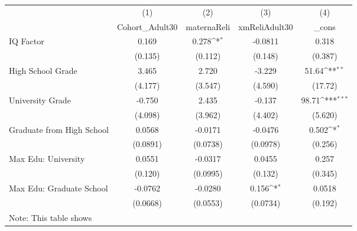 {
\def\sym#1{\ifmmode^{#1}\else\(^{#1}\)\fi}
\begin{tabular}{l*{4}{c}}
\hline\hline
            &\multicolumn{1}{c}{(1)}&\multicolumn{1}{c}{(2)}&\multicolumn{1}{c}{(3)}&\multicolumn{1}{c}{(4)}\\
            &\multicolumn{1}{c}{Cohort\_Adult30}&\multicolumn{1}{c}{maternaReli}&\multicolumn{1}{c}{xmReliAdult30}&\multicolumn{1}{c}{\_cons}\\
\hline
IQ Factor   &       0.169         &       0.278\sym{*}  &     -0.0811         &       0.318         \\
            &     (0.135)         &     (0.112)         &     (0.148)         &     (0.387)         \\
[1em]
High School Grade&       3.465         &       2.720         &      -3.229         &       51.64\sym{**} \\
            &     (4.177)         &     (3.547)         &     (4.590)         &     (17.72)         \\
[1em]
University Grade&      -0.750         &       2.435         &      -0.137         &       98.71\sym{***}\\
            &     (4.098)         &     (3.962)         &     (4.402)         &     (5.620)         \\
[1em]
Graduate from High School&      0.0568         &     -0.0171         &     -0.0476         &       0.502\sym{*}  \\
            &    (0.0891)         &    (0.0738)         &    (0.0978)         &     (0.256)         \\
[1em]
Max Edu: University&      0.0551         &     -0.0317         &      0.0455         &       0.257         \\
            &     (0.120)         &    (0.0995)         &     (0.132)         &     (0.345)         \\
[1em]
Max Edu: Graduate School&     -0.0762         &     -0.0280         &       0.156\sym{*}  &      0.0518         \\
            &    (0.0668)         &    (0.0553)         &    (0.0734)         &     (0.192)         \\
\hline\hline
\multicolumn{5}{l}{\footnotesize Note: This table shows}\\
\end{tabular}
}
